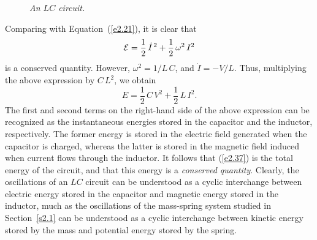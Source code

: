 \begin{figure}
\epsfysize=2.5in
\centerline{}
\caption{\em An $LC$ circuit.}\label{f2.4}   
\end{figure}

Comparing with Equation~(\ref{e2.21}),  it is
clear that
\begin{equation}
{\cal E} = \frac{1}{2}\,\dot{I}^{\,2} +\frac{1}{2}\, \omega^2\,I^2
\end{equation}
is a conserved quantity. However, $\omega^2=1/L\,C$, and $\dot{I} = -V/L$.  Thus, multiplying the
above expression by $C\,L^2$, we obtain
\begin{equation}\label{e2.37}
E = \frac{1}{2}\,C\,V^2 + \frac{1}{2}\,L\,I^2.
\end{equation}
The first and second terms on the right-hand side of the above expression can be recognized as the instantaneous energies
stored in the capacitor and the inductor, respectively. The former energy is stored in the
electric field generated when the capacitor is charged, whereas the latter is stored in the
magnetic field induced when current flows through the inductor. It follows that
(\ref{e2.37}) is the total energy of the circuit, and that this
energy is a {\em conserved quantity}.  Clearly, the oscillations
of an $LC$ circuit can be understood as a cyclic interchange between
electric energy stored in the capacitor and magnetic energy stored in the inductor, much as the oscillations of the mass-spring
system studied in Section~\ref{s2.1} can be understood as a cyclic interchange
between kinetic energy stored by the mass and  potential energy stored by the spring. 

